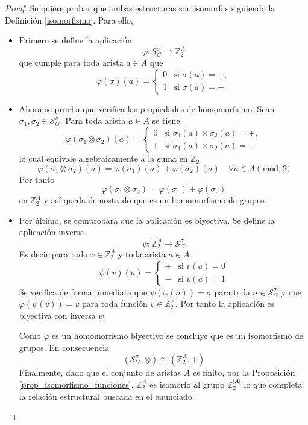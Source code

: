 \documentclass[11pt,a4paper,spanish]{report}
\theoremstyle{plain}
\begin{document}
\begin{proof}
Se quiere probar que ambas estructuras son isomorfas siguiendo la Definición \ref{isomorfismo}. Para ello,
\begin{itemize}

\item Primero se define la aplicación
\[
\varphi: \mathcal{S}_G^\sigma \longrightarrow \mathbb{Z}_2^A
\]
que cumple para toda arista $a \in A$ que
\[
\varphi(\sigma)(a) = \begin{cases} 0 & \text{si } \sigma(a) = +, \\ 1 & \text{si } \sigma(a) = - \end{cases}
\]

\item Ahora se prueba que verifica las propiedades de homomorfismo. Sean $\sigma_1, \sigma_2 \in \mathcal{S}_G^\sigma$. Para toda arista $a \in A$ se tiene
\[
\varphi(\sigma_1 \otimes \sigma_2)(a) = \begin{cases} 0 & \text{si } \sigma_1(a) \times \sigma_2(a) = +, \\ 1 & \text{si } \sigma_1(a) \times \sigma_2(a) = - \end{cases}
\]
lo cual equivale algebraicamente a la suma en $\mathbb{Z}_2$
\[
\varphi(\sigma_1 \otimes \sigma_2)(a) = \varphi(\sigma_1)(a) + \varphi(\sigma_2)(a) \quad   \forall a\in A \pmod 2
\]
Por tanto
\[
\varphi(\sigma_1 \otimes \sigma_2) = \varphi(\sigma_1) + \varphi(\sigma_2)
\]
en $\mathbb{Z}_2^A$ y así queda demostrado que es un homomorfismo de grupos.

\item Por último, se comprobará que la aplicación es biyectiva. Se define la aplicación inversa
\[
\psi: \mathbb{Z}_2^A \longrightarrow \mathcal{S}_G^\sigma
\]
Es decir para todo $v \in \mathbb{Z}_2^A$ y toda arista $a \in A$
\[
\psi(v)(a) = \begin{cases} + & \text{si } v(a) = 0 \\ - & \text{si } v(a) = 1 \end{cases}
\]
Se verifica de forma inmediata que $\psi(\varphi(\sigma)) = \sigma$ para toda $\sigma \in \mathcal{S}_G^\sigma$ y que $\varphi(\psi(v)) = v$ para toda función $v \in \mathbb{Z}_2^A$. Por tanto la aplicación es biyectiva con inversa $\psi$.

Como $\varphi$ es un homomorfismo biyectivo se concluye que es un isomorfismo de grupos. En consecuencia
\[
(\mathcal{S}_G^\sigma, \otimes) \cong (\mathbb{Z}_2^A, +)
\]
Finalmente, dado que el conjunto de aristas $A$ es finito, por la Proposición \ref{prop_isomorfismo_funciones},  $\mathbb{Z}_2^A$ es isomorfo al grupo $\mathbb{Z}_2^{|A|}$ lo que completa la relación estructural buscada en el enunciado.
\end{itemize}
\end{proof}
\end{document}
